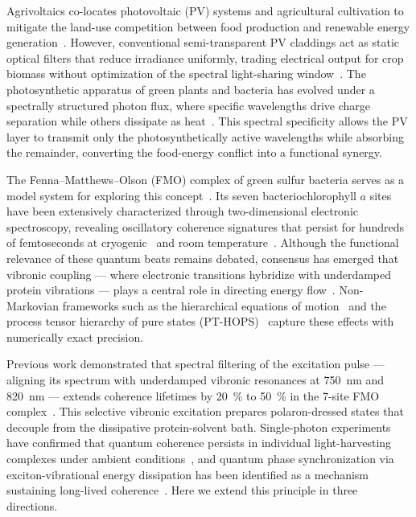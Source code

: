 \documentclass[onecolumn,a4paper,12pt]{article}
\begin{document}
Agrivoltaics co-locates photovoltaic (PV) systems and agricultural cultivation to mitigate the land-use competition between food production and renewable energy generation~\cite{Goetzberger1981,Dupraz2011}.
However, conventional semi-transparent PV claddings act as static optical filters that reduce irradiance uniformly, trading electrical output for crop biomass without optimization of the spectral light-sharing window~\cite{Thompson2020,Alshareef2024}.
The photosynthetic apparatus of green plants and bacteria has evolved under a spectrally structured photon flux, where specific wavelengths drive charge separation while others dissipate as heat~\cite{Blankenship2011}.
This spectral specificity allows the PV layer to transmit only the photosynthetically active wavelengths while absorbing the remainder, converting the food-energy conflict into a functional synergy.

The Fenna--Matthews--Olson (FMO) complex of green sulfur bacteria serves as a model system for exploring this concept~\cite{Fenna1974}.
Its seven bacteriochlorophyll $a$ sites have been extensively characterized through two-dimensional electronic spectroscopy, revealing oscillatory coherence signatures that persist for hundreds of femtoseconds at cryogenic~\cite{Engel2007} and room temperature~\cite{Panitchayangkoon2010}.
Although the functional relevance of these quantum beats remains debated, consensus has emerged that vibronic coupling --- where electronic transitions hybridize with underdamped protein vibrations --- plays a central role in directing energy flow~\cite{Chin2013,Christensson2012}.
Non-Markovian frameworks such as the hierarchical equations of motion~\cite{Tanimura1989} and the process tensor hierarchy of pure states (PT-HOPS)~\cite{Varvelo2021,Citty2024} capture these effects with numerically exact precision.

Previous work demonstrated that spectral filtering of the excitation pulse --- aligning its spectrum with underdamped vibronic resonances at \qty{750}{\nm} and \qty{820}{\nm} --- extends coherence lifetimes by \qty{20}{\percent} to \qty{50}{\percent} in the 7-site FMO complex~\cite{Kouam2026}.
This selective vibronic excitation prepares polaron-dressed states that decouple from the dissipative protein-solvent bath.
Single-photon experiments have confirmed that quantum coherence persists in individual light-harvesting complexes under ambient conditions~\cite{Li2023}, and quantum phase synchronization via exciton-vibrational energy dissipation has been identified as a mechanism sustaining long-lived coherence~\cite{Zhu2024}.
Here we extend this principle in three directions.
\end{document}
